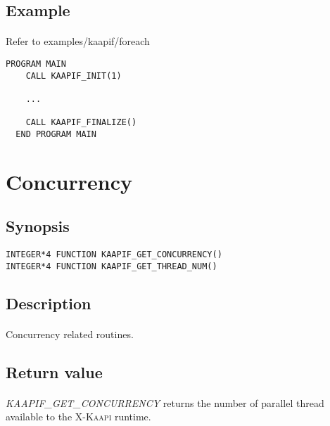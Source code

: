 \documentclass[a4paper, 11pt]{article}
\newcommand{\kaapi}{\textsc{X-Kaapi}\xspace}
\begin{document}
\subsection{Example}
\paragraph{}
Refer to examples/kaapif/foreach\\
\begin{small}
\begin{lstlisting}[frame=tb]
  PROGRAM MAIN
    CALL KAAPIF_INIT(1)

    ...

    CALL KAAPIF_FINALIZE()
  END PROGRAM MAIN
\end{lstlisting}
\end{small}


\newpage
\section{Concurrency}

\subsection{Synopsis}
\begin{small}
\lstset{language=C}
\begin{lstlisting}[frame=tb]
INTEGER*4 FUNCTION KAAPIF_GET_CONCURRENCY()
INTEGER*4 FUNCTION KAAPIF_GET_THREAD_NUM()
\end{lstlisting}
\end{small}

\subsection{Description}
\paragraph{}
Concurrency related routines.

\subsection{Return value}
\paragraph{}
\textit{KAAPIF\_GET\_CONCURRENCY} returns the number of parallel thread available
to the \kaapi runtime.
\end{document}
